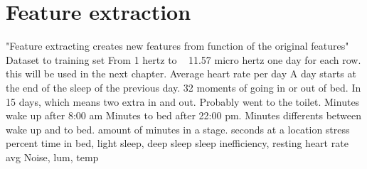 	\section{Feature extraction}
			"Feature extracting creates new features from function of the original features"
			Dataset to training set
			From 1 hertz to  ~ 11.57 micro hertz 
			one day for each row. this will be used in the next chapter.
			Average heart rate per day
			A day starts at the end of the sleep of the previous day.
			32 moments of going in or out of bed. In 15 days, which means two extra in and out. Probably went to the toilet.
			Minutes wake up after 8:00 am
			Minutes to bed after 22:00 pm.
			Minutes differents between wake up and to bed.
			amount of minutes in a stage.
			seconds at a location
			stress percent
			time in bed, light sleep, deep sleep
			sleep inefficiency,
			resting heart rate
			avg Noise, lum, temp



